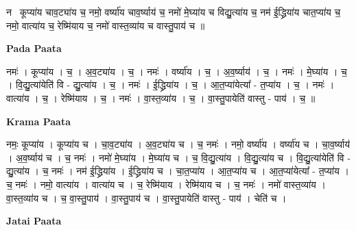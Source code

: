 \documentclass[17pt]{extarticle}
\begin{document}
नमः᳡कूप्या॑य चाव॒ट्या॑य च॒ नमो॒ वर्ष्या॑य चाव॒र्ष्याय॑ च॒ नमो॑ मे॒घ्या॑य च विद्यु॒त्या॑य च॒ नम॑ ई॒द्ध्रिया॑य चात॒प्या॑य च॒ नमो॒ वात्या॑य च॒ रेष्मि॑याय च॒ नमो॑ वास्त॒व्या॑य च वास्तु॒पाय॑ च ॥ \newline

\textbf{Pada Paata} \newline

नमः॑ । कूप्या॑य । च॒ । अ॒व॒ट्या॑य । च॒ । नमः॑ । वर्ष्या॑य । च॒ । अ॒व॒र्ष्याय॑ । च॒ । नमः॑ । मे॒घ्या॑य । च॒ । वि॒द्यु॒त्या॑येति॑ वि - द्यु॒त्या॑य । च॒ । नमः॑ । ई॒द्ध्रिया॑य । च॒ । आ॒त॒प्या॑येत्या᳚ - त॒प्या॑य । च॒ । नमः॑ । वात्या॑य । च॒ । रेष्मि॑याय । च॒ । नमः॑ । वा॒स्त॒व्या॑य । च॒ । वा॒स्तु॒पायेति॑ वास्तु - पाय॑ । च॒ ॥  \newline


\textbf{Krama Paata} \newline

नमः॒ कूप्या॑य । कूप्या॑य च । चा॒व॒ट्या॑य । अ॒व॒ट्या॑य च । च॒ नमः॑ । नमो॒ वर्ष्या॑य । वर्ष्या॑य च । चा॒व॒र्ष्याय॑ । अ॒व॒र्ष्याय॑ च । च॒ नमः॑ । नमो॑ मे॒घ्या॑य । मे॒घ्या॑य च । च॒ वि॒द्यु॒त्या॑य । वि॒द्यु॒त्या॑य च । वि॒द्यु॒त्या॑येति॑ वि - द्यु॒त्या॑य । च॒ नमः॑ । नम॑ ई॒द्ध्रिया॑य । ई॒द्ध्रिया॑य च । चा॒त॒प्या॑य । आ॒त॒प्या॑य च । आ॒त॒प्या॑येत्या᳚ - त॒प्या॑य । च॒ नमः॑ । नमो॒ वात्या॑य । वात्या॑य च । च॒ रेष्मि॑याय । रेष्मि॑याय च । च॒ नमः॑ । नमो॑ वास्त॒व्या॑य । वा॒स्त॒व्या॑य च । च॒ वा॒स्तु॒पाय॑ । वा॒स्तु॒पाय॑ च । वा॒स्तु॒पायेति॑ वास्तु - पाय॑ । चेति॑ च । \newline

\textbf{Jatai Paata} \newline
\end{document}
